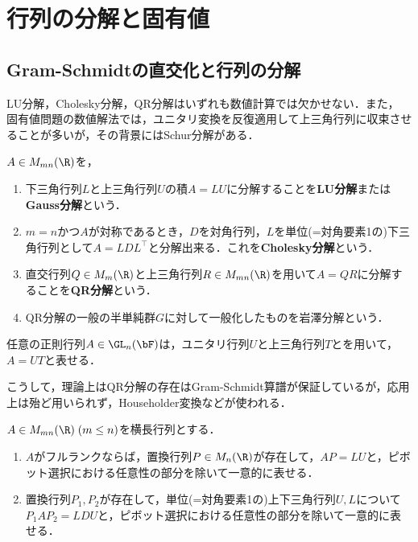 \documentclass[uplatex, dvipdfmx]{jsreport}
\begin{document}
\section{行列の分解と固有値}

\subsection{Gram-Schmidtの直交化と行列の分解}

\begin{tcolorbox}[colframe=ForestGreen, colback=ForestGreen!10!white,breakable,colbacktitle=ForestGreen!40!white,coltitle=black,fonttitle=\bfseries\sffamily,
title=]
    LU分解，Cholesky分解，QR分解はいずれも数値計算では欠かせない．また，
    固有値問題の数値解法では，ユニタリ変換を反復適用して上三角行列に収束させることが多いが，その背景にはSchur分解がある．
\end{tcolorbox}

\begin{definition}
    $A\in M_{mn}(\R)$を，
    \begin{enumerate}
        \item 下三角行列$L$と上三角行列$U$の積$A=LU$に分解することを\textbf{LU分解}または\textbf{Gauss分解}という．
        \item $m=n$かつ$A$が対称であるとき，$D$を対角行列，$L$を単位(=対角要素1の)下三角行列として$A=LDL^\top$と分解出来る．これを\textbf{Cholesky分解}という．
        \item 直交行列$Q\in M_m(\R)$と上三角行列$R\in M_{mn}(\R)$を用いて$A=QR$に分解することを\textbf{QR分解}という．
        \item QR分解の一般の半単純群$G$に対して一般化したものを岩澤分解という．
    \end{enumerate}
\end{definition}


\begin{proposition}
    任意の正則行列$A\in\GL_n(\bF)$は，ユニタリ行列$U$と上三角行列$T$とを用いて，$A=UT$と表せる．
\end{proposition}
\begin{remarks}
    こうして，理論上はQR分解の存在はGram-Schmidt算譜が保証しているが，応用上は殆ど用いられず，Householder変換などが使われる．
\end{remarks}

\begin{proposition}[$LU$-分解]
    $A\in M_{mn}(\R)\;(m\le n)$を横長行列とする．
    \begin{enumerate}
        \item $A$がフルランクならば，置換行列$P\in M_n(\R)$が存在して，$AP=LU$と，ピボット選択における任意性の部分を除いて一意的に表せる．
        \item 置換行列$P_1,P_2$が存在して，単位(=対角要素1の)上下三角行列$U,L$について$P_1AP_2=LDU$と，ピボット選択における任意性の部分を除いて一意的に表せる．
    \end{enumerate}
\end{proposition}
    
\end{document}
